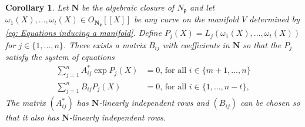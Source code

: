 \documentclass{article}
\newtheorem{corollary}{Corollary}[section]
\newcommand{\mfrak}[1]{\mathfrak{#1}}
\numberwithin{equation}{section}
\begin{document}
\begin{corollary}\label{cor: Any curve on V gives a solution to a system of equations}
	Let $\bm N$ be the algebraic closure of $N_{\mfrak p}$ and let $\omega_1(X), ..., \omega_t(X) \in O_{\bm {N_{\mfrak p}}}[[X]]$ be any curve on the manifold $V$ determined by \cref{eq: Equations inducing a manifold}. Define $P_j(X) = L_j(\omega_1(X), ..., \omega_t(X))$ for $j \in \{1, ..., n\}$. There exists a matrix $B_{ij}$ with coefficients in $\bm N$ so that the $P_j$ satisfy the system of equations
	\begin{equation}\label{eq: System that can also be solved}
    	\begin{aligned}
        	\sum_{j=1}^n A^*_{ij}\exp P_j(X) & = 0 \text{, for all } i \in \{ m+1, ..., n \} \\
        	\sum_{j=1}^n B_{ij}P_j(X)    	& = 0 \text{, for all } i \in \{1,  ..., n-t\},
    	\end{aligned}
	\end{equation}
	The matrix $(A^*_{ij})$ has $\bm N$-linearly independent rows and $(B_{ij})$ can be chosen so that it also has $\bm N$-linearly independent rows.
\end{corollary}
\end{document}
